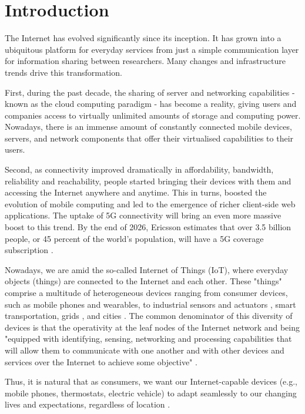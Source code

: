 \section{Introduction}
\label{sec:introduction}

The Internet has evolved significantly since its inception. It has grown into a ubiquitous platform for everyday services from just a simple communication layer for information sharing between researchers. Many changes and infrastructure trends drive this transformation.

First, during the past decade, the sharing of server and networking capabilities - known as the cloud computing paradigm - has become a reality, giving users and companies access to virtually unlimited amounts of storage and computing power. Nowadays, there is an immense amount of constantly connected mobile devices, servers, and network components that offer their virtualised capabilities to their users.

Second, as connectivity improved dramatically in affordability, bandwidth, reliability and reachability, people started bringing their devices with them and accessing the Internet anywhere and anytime. This in turns, boosted the evolution of mobile computing and led to the emergence of richer client-side web applications. The uptake of 5G connectivity will bring an even more massive boost to this trend. By the end of 2026, Ericsson estimates that over 3.5 billion people, or 45 percent of the world's population, will have a 5G coverage subscription \cite{ericsson-5g}.

Nowadays, we are amid the so-called Internet of Things (IoT), where everyday objects (things) are connected to the Internet and each other. These "things" comprise a multitude of heterogeneous devices ranging from consumer devices, such as mobile phones and wearables, to industrial sensors and actuators \cite{iot-manifacturing}, smart transportation, grids \cite{dsu}, and cities \cite{saaas}. The common denominator of this diversity of devices is that the operativity at the leaf nodes of the Internet network and being "equipped with identifying, sensing, networking and processing capabilities that will allow them to communicate with one another and with other devices and services over the Internet to achieve some objective" \cite{iot-definition}.

Thus, it is natural that as consumers, we want our Internet-capable devices (e.g., mobile phones, thermostats, electric vehicle) to adapt seamlessly to our changing lives and expectations, regardless of location \cite{harnessing-continuum}.

